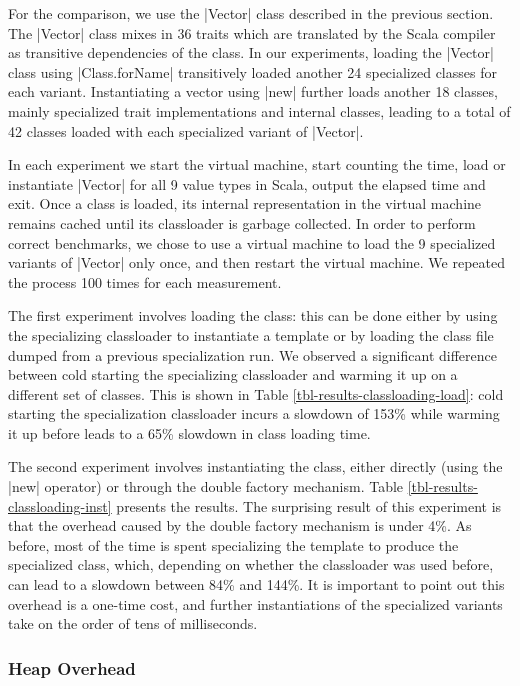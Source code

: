 For the comparison, we use the |Vector| class described in the previous section. The |Vector| class mixes in 36 traits \cite{scalable-component-abstractions} which are translated by the Scala compiler as transitive dependencies of the class. In our experiments, loading the |Vector| class using |Class.forName| transitively loaded another 24 specialized classes for each variant. Instantiating a vector using |new| further loads another 18 classes, mainly specialized trait implementations and internal classes, leading to a total of 42 classes loaded with each specialized variant of |Vector|. 

In each experiment we start the virtual machine, start counting the time, load or instantiate |Vector| for all 9 value types in Scala, output the elapsed time and exit. Once a class is loaded, its internal representation in the virtual machine remains cached until its classloader is garbage collected. In order to perform correct benchmarks, we chose to use a virtual machine to load the 9 specialized variants of |Vector| only once, and then restart the virtual machine. We repeated the process 100 times for each measurement. 

The first experiment involves loading the class: this can be done either by using the specializing classloader to instantiate a template or by loading the class file dumped from a previous specialization run. We observed a significant difference between cold starting the specializing classloader and warming it up on a different set of classes. This is shown in Table \ref{tbl-results-classloading-load}: cold starting the specialization classloader incurs a slowdown of 153\% while warming it up before leads to a 65\% slowdown in class loading time.   

The second experiment involves instantiating the class, either directly (using the |new| operator) or through the double factory mechanism. Table \ref{tbl-results-classloading-inst} presents the results. The surprising result of this experiment is that the overhead caused by the double factory mechanism is under 4\%. As before, most of the time is spent specializing the template to produce the specialized class, which, depending on whether the classloader was used before, can lead to a slowdown between 84\% and 144\%. It is important to point out this overhead is a one-time cost, and further instantiations of the specialized variants take on the order of tens of milliseconds. 

\subsubsection*{Heap Overhead}

